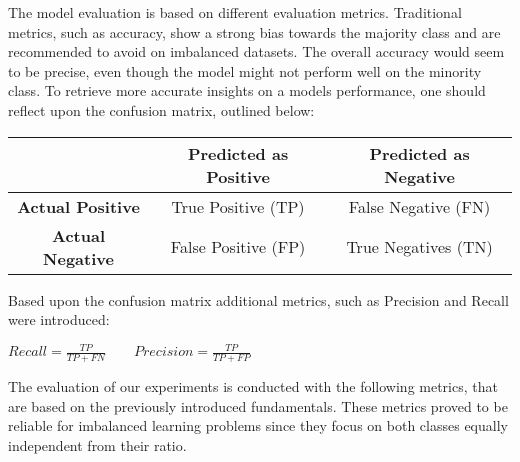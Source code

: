 \documentclass[parskip=full]{scrartcl}
\begin{document}

The model evaluation is based on different evaluation metrics. Traditional metrics, such as accuracy, show a strong bias towards the majority class and are recommended to avoid on imbalanced datasets. The overall accuracy would seem to be precise, even though the model might not perform well on the minority class. To retrieve more accurate insights on a models performance, one should reflect upon the confusion matrix, outlined below: 

\begin{center}
\begin{tabular}{ c|c|c }
  & \textbf{Predicted as Positive} & \textbf{Predicted as Negative} \\  [1ex] 
  \hline
 \textbf{Actual Positive} & True Positive (TP) & False Negative (FN) \\  [1ex] 
 \textbf{Actual Negative} & False Positive (FP) & True Negatives (TN) \\ [1ex] 
\end{tabular}
\end{center}

Based upon the confusion matrix additional metrics, such as Precision and Recall \cite{Dalianis2018} were introduced: 
\begin{center} $ Recall = \frac{TP}{TP + FN} \qquad Precision =  \frac{TP}{TP + FP}$\end{center}

The evaluation of our experiments is conducted with the following metrics, that are based on the previously introduced fundamentals. These metrics proved to be reliable for imbalanced learning problems since they focus on both classes equally independent from their ratio.
\end{document}
